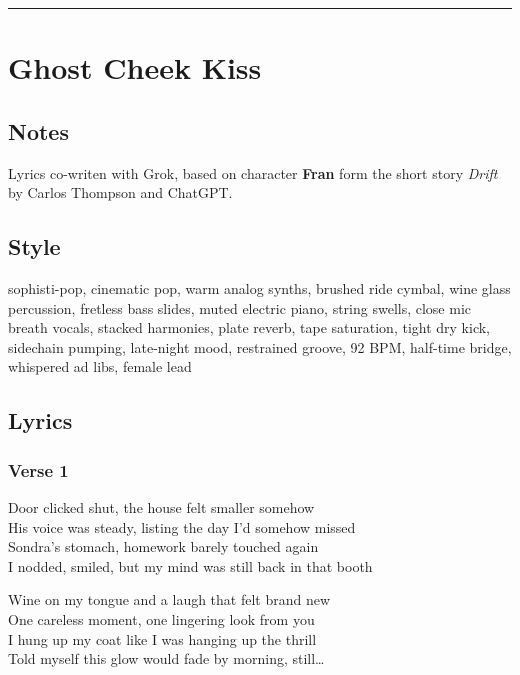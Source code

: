 \begin{center}\rule{0.5\linewidth}{0.5pt}\end{center}

\section{Ghost Cheek Kiss}\label{ghost-cheek-kiss}

\subsection{Notes}\label{notes-39}

Lyrics co-writen with Grok, based on character \textbf{Fran} form the
short story \emph{Drift} by Carlos Thompson and ChatGPT.

\subsection{Style}\label{style-38}

sophisti-pop, cinematic pop, warm analog synths, brushed ride cymbal,
wine glass percussion, fretless bass slides, muted electric piano,
string swells, close mic breath vocals, stacked harmonies, plate reverb,
tape saturation, tight dry kick, sidechain pumping, late-night mood,
restrained groove, 92 BPM, half-time bridge, whispered ad libs, female
lead

\subsection{Lyrics}\label{lyrics-38}

\subsubsection{Verse 1}\label{verse-1-27}

Door clicked shut, the house felt smaller somehow\\
His voice was steady, listing the day I'd somehow missed\\
Sondra's stomach, homework barely touched again\\
I nodded, smiled, but my mind was still back in that booth

Wine on my tongue and a laugh that felt brand new\\
One careless moment, one lingering look from you\\
I hung up my coat like I was hanging up the thrill\\
Told myself this glow would fade by morning, still\ldots{}

